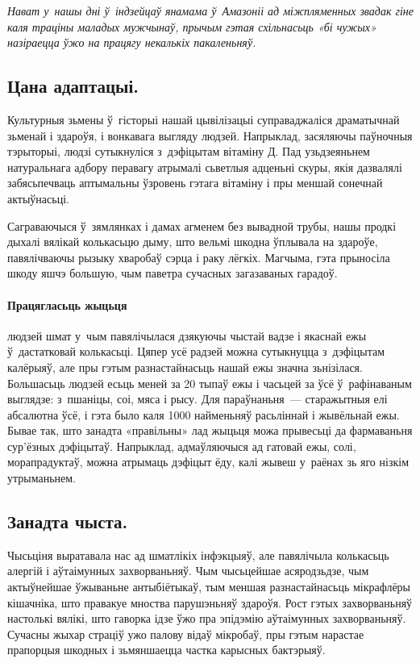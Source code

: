 \emph{Нават у~нашы дні ў~індзейцаў янамама ў~Амазоніі ад міжпляменных звадак гіне каля траціны маладых мужчынаў, прычым гэтая схільнасьць «бі чужых» назіраецца ўжо на працягу некалькіх пакаленьняў.}

\subsection*{Цана адаптацыі.}

Культурныя зьмены ў~гісторыі нашай цывілізацыі суправаджаліся драматычнай зьменай і здароўя, і вонкавага выгляду людзей. Напрыклад, засяляючы паўночныя тэрыторыі, людзі сутыкнуліся з~дэфіцытам вітаміну Д. Пад узьдзеяньнем натуральнага адбору перавагу атрымалі сьветлыя адценьні скуры, якія дазвалялі забясьпечваць аптымальны ўзровень гэтага вітаміну і пры меншай сонечнай актыўнасьці. 

Саграваючыся ў~зямлянках і дамах агменем без вывадной трубы, нашы продкі дыхалі вялікай колькасьцю дыму, што вельмі шкодна ўплывала на здароўе, павялічваючы рызыку хваробаў сэрца і раку лёгкіх. Магчыма, гэта прыносіла шкоду яшчэ большую, чым паветра сучасных загазаваных гарадоў.

\paragraph{Працягласьць жыцьця} людзей шмат у~чым павялічылася дзякуючы чыстай вадзе і якаснай ежы ў~дастатковай колькасьці. Цяпер усё радзей можна сутыкнуцца з~дэфіцытам калёрыяў, але пры гэтым разнастайнасьць нашай ежы значна зьнізілася. Большасьць людзей есьць меней за 20 тыпаў ежы і часьцей за ўсё ў~рафінаваным выглядзе: з~пшаніцы, соі, мяса і рысу. Для параўнаньня~--- старажытныя елі абсалютна ўсё, і гэта было каля 1000 найменьняў расьліннай і жывёльнай ежы. Бывае так, што занадта «правільны» лад жыцьця можа прывесьці да фармаваньня сур'ёзных дэфіцытаў. Напрыклад, адмаўляючыся ад гатовай ежы, солі, морапрадуктаў, можна атрымаць дэфіцыт ёду, калі жывеш у~раёнах зь яго нізкім утрыманьнем.

\subsection*{Занадта чыста.} 

Чысьціня выратавала нас ад шматлікіх інфэкцыяў, але павялічыла колькасьць алергій і аўтаімунных захворваньняў. Чым чысьцейшае асяродзьдзе, чым актыўнейшае ўжываньне антыбіётыкаў, тым меншая разнастайнасьць мікрафлёры кішачніка, што правакуе мноства парушэньняў здароўя. Рост гэтых захворваньняў настолькі вялікі, што гаворка ідзе ўжо пра эпідэмію аўтаімунных захворваньняў. Сучасны жыхар страціў ужо палову відаў мікробаў, пры гэтым нарастае прапорцыя шкодных і зьмяншаецца частка карысных бактэрыяў.


